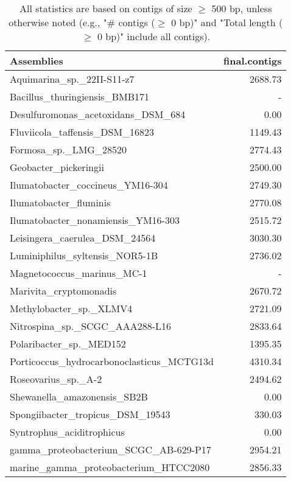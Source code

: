 \documentclass[12pt,a4paper]{article}
\begin{document}
\begin{table}[ht]
\begin{center}
\caption{All statistics are based on contigs of size $\geq$ 500 bp, unless otherwise noted (e.g., "\# contigs ($\geq$ 0 bp)" and "Total length ($\geq$ 0 bp)" include all contigs).}
\begin{tabular}{|l*{1}{|r}|}
\hline
Assemblies & final.contigs \\ \hline
Aquimarina\_sp.\_22II-S11-z7 & 2688.73 \\ \hline
Bacillus\_thuringiensis\_BMB171 & - \\ \hline
Desulfuromonas\_acetoxidans\_DSM\_684 & 0.00 \\ \hline
Fluviicola\_taffensis\_DSM\_16823 & 1149.43 \\ \hline
Formosa\_sp.\_LMG\_28520 & 2774.43 \\ \hline
Geobacter\_pickeringii & 2500.00 \\ \hline
Ilumatobacter\_coccineus\_YM16-304 & 2749.30 \\ \hline
Ilumatobacter\_fluminis & 2770.08 \\ \hline
Ilumatobacter\_nonamiensis\_YM16-303 & 2515.72 \\ \hline
Leisingera\_caerulea\_DSM\_24564 & 3030.30 \\ \hline
Luminiphilus\_syltensis\_NOR5-1B & 2736.02 \\ \hline
Magnetococcus\_marinus\_MC-1 & - \\ \hline
Marivita\_cryptomonadis & 2670.72 \\ \hline
Methylobacter\_sp.\_XLMV4 & 2721.09 \\ \hline
Nitrospina\_sp.\_SCGC\_AAA288-L16 & 2833.64 \\ \hline
Polaribacter\_sp.\_MED152 & 1395.35 \\ \hline
Porticoccus\_hydrocarbonoclasticus\_MCTG13d & 4310.34 \\ \hline
Roseovarius\_sp.\_A-2 & 2494.62 \\ \hline
Shewanella\_amazonensis\_SB2B & 0.00 \\ \hline
Spongiibacter\_tropicus\_DSM\_19543 & 330.03 \\ \hline
Syntrophus\_aciditrophicus & 0.00 \\ \hline
gamma\_proteobacterium\_SCGC\_AB-629-P17 & 2954.21 \\ \hline
marine\_gamma\_proteobacterium\_HTCC2080 & 2856.33 \\ \hline
\end{tabular}
\end{center}
\end{table}
\end{document}
